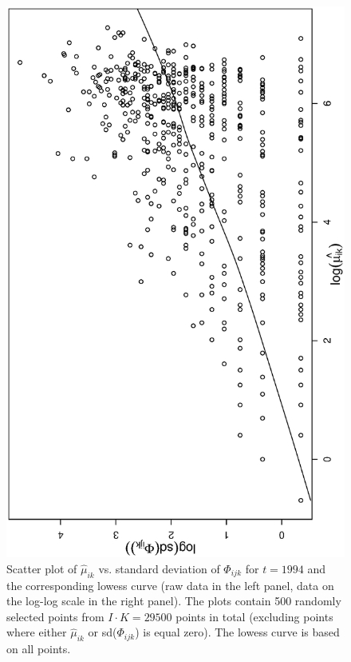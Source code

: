 \documentclass[11pt, fleqn]{article}
\begin{document}
\begin{figure}[t]
\begin{center}
\begin{minipage}{8cm}
\includegraphics[scale=0.3, angle=-90]{pic/hu_lmean_lsd_all.ps}
\end{minipage}
\caption{\label{fig:mean-sd}\small Scatter plot of $\hat{\mu}_{ik}$
  vs. standard deviation of $\Phi_{ijk}$ for $t=1994$ and the corresponding
  lowess curve (raw data in the left panel, data on the log-log scale in the
  right panel). The plots contain 500 randomly selected points from $I\cdot K
  = 29500$ points in total (excluding points where either $\hat{\mu}_{ik}$ or
  sd($\Phi_{ijk}$) is equal zero). The lowess curve is based on all points.}
\end{center}
\end{figure}
\end{document}
